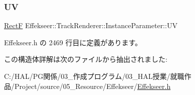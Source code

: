 \subsubsection{\texorpdfstring{UV}{UV}}
{\footnotesize\ttfamily \mbox{\hyperlink{struct_effekseer_1_1_rect_f}{RectF}} Effekseer\+::\+Track\+Renderer\+::\+Instance\+Parameter\+::\+UV}



 Effekseer.\+h の 2469 行目に定義があります。



この構造体詳解は次のファイルから抽出されました\+:\begin{DoxyCompactItemize}
\item 
C\+:/\+H\+A\+L/\+P\+G関係/03\+\_\+作成プログラム/03\+\_\+\+H\+A\+L授業/就職作品/\+Project/source/05\+\_\+\+Resource/\+Effekseer/\mbox{\hyperlink{_effekseer_8h}{Effekseer.\+h}}\end{DoxyCompactItemize}
